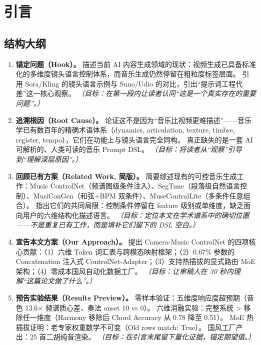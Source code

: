 \documentclass[UTF8,12pt,a4paper]{ctexart}
\begin{document}
\section{引言}

\subsection*{结构大纲}
\begin{enumerate}[leftmargin=2em,label={\textbf{段落 \arabic*:}}]

\item \textbf{锚定问题（Hook）。}
描述当前 AI 内容生成领域的现状：视频生成已具备标准化的多维度镜头语言控制体系，而音乐生成仍然停留在粗粒度标签层面。
引用 Sora/Kling 的镜头语言示例与 Suno/Udio 的对比，引出“提示词工程代差”这一核心观察。
\textit{（目标：在第一段内让读者认同“这是一个真实存在的重要问题”。）}

\item \textbf{追溯根因（Root Cause）。}
论证这不是因为“音乐比视频更难描述”——音乐学已有数百年的精确术语体系（dynamics, articulation, texture, timbre, register, tempo），它们在功能上与镜头语言完全同构。
真正缺失的是一套 AI 可解析的、人类可读的音乐 Prompt DSL。
\textit{（目标：将读者从“观察”引导到“理解深层原因”。）}

\item \textbf{回顾已有方案（Related Work, 简版）。}
简要综述现有的可控音乐生成工作：Music ControlNet（频谱图级条件注入）、SegTune（段落级自然语言控制）、MusiConGen（和弦+BPM 双条件）、MuseControlLite（多条件任意组合）。
指出它们的共同局限：控制条件停留在 feature 级别或单维度，缺乏面向用户的六维结构化描述语言。
\textit{（目标：定位本文在学术谱系中的确切位置——不是重复已有工作，而是填补它们留下的 DSL 空白。）}

\item \textbf{宣告本文方案（Our Approach）。}
提出 Camera-Music ControlNet 的四项核心贡献：（1）六维 Token 词汇表与跨模态映射框架；（2）0.67\% 参数的 Concatenation 注入式 ControlNet-Adapter；（3）支持热插拔的显式路由 MoE 架构；（4）零成本国风自动化数据工厂。
\textit{（目标：让审稿人在 30 秒内理解“这篇论文做了什么”。）}

\item \textbf{预告实验结果（Results Preview）。}
零样本验证：五维度响应度超预期（音色 13.6$\times$ 频谱质心差、奏法 onset 10 vs 0）。
六维消融实验：完整系统 > 移除任一维度（Harmony 移除后 Chord Accuracy 从 0.78 降至 0.51）。
MoE 热插拔证明：老专家权重数学不可变（Old rows match: True）。
国风工厂产出：25 首二胡纯音渲染。
\textit{（目标：在引言末尾留下量化证据，锚定期望值。）}

\end{enumerate}
\end{document}
